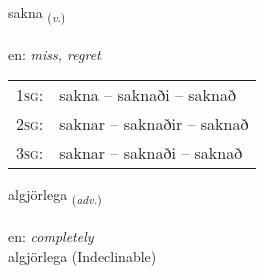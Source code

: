 \documentclass[frontgrid, backgrid]{flacards}\usepackage[]{graphicx}\usepackage[]{color}
\begin{document}
\renewcommand{\flhead}{\vskip5pt \fboxsep=0pt {\small\bfseries\footnotesize Sagnorð | Verb}}
\renewcommand{\fcfoot}{\vskip5pt \fboxsep=0pt \hspace{2pt}{\small\bfseries\footnotesize 2K}}

\renewcommand{\blhead}{\vskip5pt {\small\bfseries\footnotesize Sagnorð | Verb }}
\renewcommand{\bcfoot}{\vskip5pt \hspace{2pt}{\small\bfseries\footnotesize 2K}}


{sakna \small{\textsubscript{(\textit{v.})}} \\[1ex] %
\textphonetic{[sahkna]} \\
en: \emph{miss, regret} \\  [2ex]
\renewcommand*{\arraystretch}{0.8}
\begin{tabular}{p{1cm}l}
\textsc{1sg}: & sakna -- saknaði -- saknað \\ 
\textsc{2sg}: & saknar -- saknaðir -- saknað \\ 
\textsc{3sg}: & saknar -- saknaði -- saknað \\ 
\end{tabular}
}


\renewcommand{\flhead}{\vskip5pt \fboxsep=0pt {\small\bfseries\footnotesize Atviksorð | Adverb}}
\renewcommand{\fcfoot}{\vskip5pt \fboxsep=0pt \hspace{2pt}{\small\bfseries\footnotesize 2K}}

\renewcommand{\blhead}{\vskip5pt {\small\bfseries\footnotesize Atviksorð | Adverb }}
\renewcommand{\bcfoot}{\vskip5pt \hspace{2pt}{\small\bfseries\footnotesize 2K}}


{algjörlega \small{\textsubscript{(\textit{adv.})}} \\[1ex]
\textphonetic{[alcœrlɛɣa]} \\
en: \emph{completely} \\  [2ex]
algjörlega (Indeclinable)}

\renewcommand{\flhead}{\vskip5pt \fboxsep=0pt {\small\bfseries\footnotesize Nafnorð | Noun}}
\renewcommand{\fcfoot}{\vskip5pt \fboxsep=0pt \hspace{2pt}{\small\bfseries\footnotesize 2K}}
\end{document}
